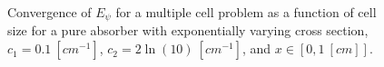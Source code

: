 \begin{figure}[!htp]
\begin{center}
{}
\end{center}
\caption{Convergence of $E_{\psi}$ for a multiple cell problem as a function of cell size for a pure absorber with exponentially varying cross section, $c_1 = 0.1~[cm^{-1}]$, $c_2 = 2\ln(10)~[cm^{-1}]$, and $x\in \left[0,1~[cm] \right]$.}
\label{fig:varxs_psi_L2}
\end{figure}
%
%
%
